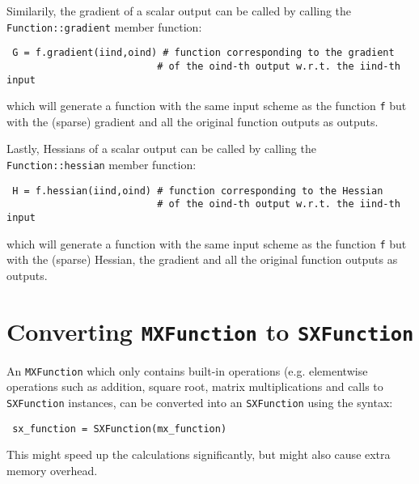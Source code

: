 \documentclass[a4paper,12pt]{book}
\begin{document}
Similarily, the gradient of a scalar output can be called by calling the \texttt{Function::gradient} member function:
\begin{verbatim}
 G = f.gradient(iind,oind) # function corresponding to the gradient
                          # of the oind-th output w.r.t. the iind-th input
\end{verbatim}
which will generate a function with the same input scheme as the function \texttt{f} but with the (sparse) gradient and all the original function outputs as outputs.

Lastly, Hessians of a scalar output can be called by calling the \texttt{Function::hessian} member function:
\begin{verbatim}
 H = f.hessian(iind,oind) # function corresponding to the Hessian
                          # of the oind-th output w.r.t. the iind-th input
\end{verbatim}
which will generate a function with the same input scheme as the function \texttt{f} but with the (sparse) Hessian, the gradient and all the original function outputs as outputs.

\section{Converting \texttt{MXFunction} to \texttt{SXFunction}}
An \texttt{MXFunction} which only contains built-in operations (e.g. elementwise operations such as addition, square root, matrix multiplications and calls to \texttt{SXFunction} instances, can be converted into an \texttt{SXFunction} using the syntax:
\begin{verbatim}
 sx_function = SXFunction(mx_function)
\end{verbatim}

This might speed up the calculations significantly, but might also cause extra memory overhead.



\end{document}
